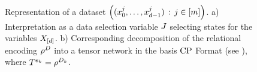 \begin{figure}[h]
\begin{center}
	
\end{center}
\caption{
	Representation of a dataset $\left(({x_{0}^{j},\ldots,x_{d-1}^{j}})\,:\,j\in[m]\right)$.
	a) Interpretation as a data selection variable $J$ selecting states for the variables $X_{[d]}$.
	b) Corresponding decomposition of the relational encoding $\rho^{D}$ into a tensor network in the basis $\mathrm{CP}$ Format (see ), where $T^{e_{k}}=\rho^{D_{k}}$.
}
\label{fig:DataDecomposition}
\end{figure}


